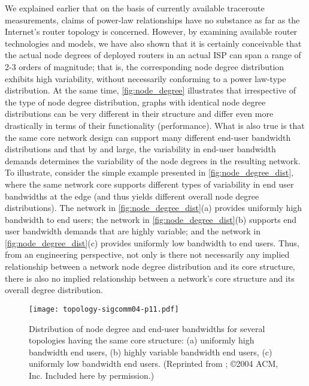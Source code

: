 We explained earlier that on the basis of currently available traceroute
measurements, claims of power-law relationships have no substance as far as
the Internet's router topology is concerned.  However, by examining available
router technologies and models, we have also shown that it is certainly conceivable 
that the actual node degrees of deployed routers in an actual ISP can span a range 
of 2-3 orders of magnitude; that is, the corresponding node degree distribution exhibits 
high variability, without necessarily conforming to a power law-type distribution. 
At the same time, \autoref{fig:node_degree} illustrates that irrespective of the type of node degree
distribution, graphs with identical node degree distributions can be very different 
in their structure and differ even more drastically in terms of their functionality
(\eg performance). What is also true is that the same core network design can 
support many different end-user bandwidth distributions and that by and large, 
the variability in end-user bandwidth demands determines the variability of the 
node degrees in the resulting network. To illustrate, consider the simple example
presented in \autoref{fig:node_degree_dist}, where the same network core supports different types of 
variability in end user bandwidths at the edge (and thus yields different overall 
node degree distributions). The network in \autoref{fig:node_degree_dist}(a) provides uniformly high 
bandwidth to end users; the network in \autoref{fig:node_degree_dist}(b) supports end user bandwidth 
demands that are highly variable; and the network in \autoref{fig:node_degree_dist}(c) provides uniformly low bandwidth to end users. Thus, from an engineering perspective, not only 
is there not necessarily any implied relationship between a network node degree 
distribution and its core structure, there is also no implied relationship between 
a network's core structure and its overall degree distribution. 

\begin{figure}[!bp] 
  \begin{center}
    \texttt{[image: topology-sigcomm04-p11.pdf]}
     \caption{Distribution of node degree and end-user bandwidths for
       several topologies having the same core structure: (a)
       uniformly high bandwidth end users, (b) highly variable
       bandwidth end users, (c) uniformly low bandwidth end
       users. 
       (Reprinted from  \cite{Li04}; \copyright 2004 ACM, Inc. Included here by permission.)
       \label{fig:node_degree_dist}}
  \end{center}
\end{figure}         

